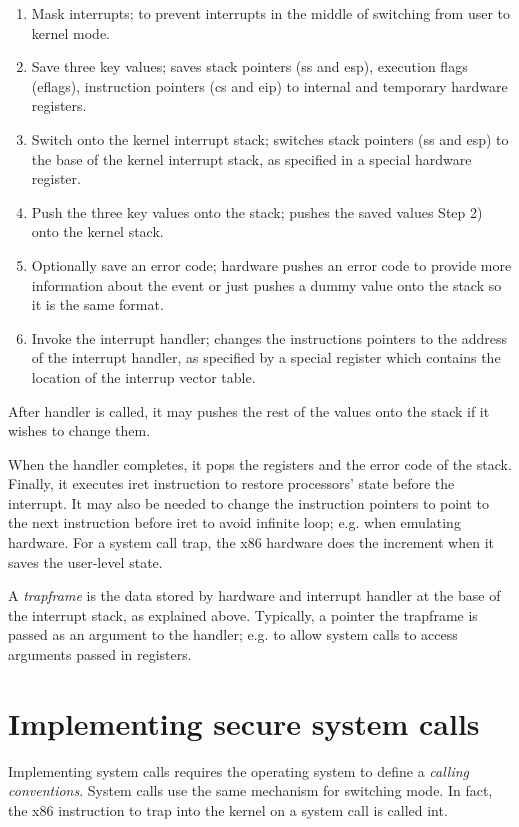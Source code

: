 \begin{enumerate}
    \item Mask interrupts; to prevent interrupts in the middle of switching from user to kernel mode.
    \item Save three key values; saves stack pointers (ss and esp), execution flags (eflags), instruction pointers (cs and eip) to internal and temporary hardware registers.
    \item Switch onto the kernel interrupt stack;  switches stack pointers (ss and esp) to the base of the kernel interrupt stack, as specified in a special hardware register.
    \item Push the three key values onto the stack; pushes the saved values Step 2) onto the kernel stack.
    \item Optionally save an error code; hardware pushes an error code to provide more information about the event or just pushes a dummy value onto the stack so it is the same format.
    \item Invoke the interrupt handler; changes the instructions pointers to the address of the interrupt handler, as specified by a special register which contains the location of the interrup vector table.
\end{enumerate}
After handler is called, it may pushes the rest of the values onto the stack if it wishes to change them. 

When the handler completes, it pops the registers and the error code of the stack. Finally, it executes iret instruction to restore processors' state before the interrupt. It may also be needed to change the instruction pointers to point to the next instruction before iret to avoid infinite loop; e.g. when emulating hardware. For a system call trap, the x86 hardware does the increment when it saves the user-level state. 

A \textit{trapframe} is the data stored by hardware and interrupt handler at the base of the interrupt stack, as explained above. Typically, a pointer the trapframe is passed as an argument to the handler; e.g. to allow system calls to access arguments passed in registers.
\section{Implementing secure system calls}
Implementing system calls requires the operating system to define a \textit{calling conventions}. System calls use the same mechanism for switching mode. In fact, the x86 instruction to trap into the kernel on a system call is called int.  

